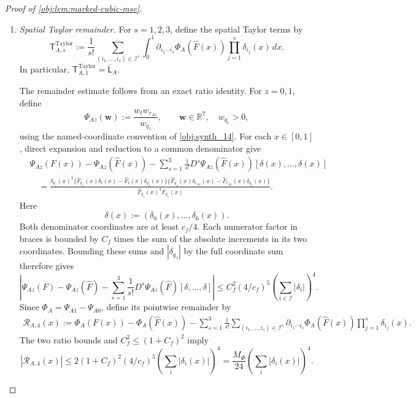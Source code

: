 \documentclass[11pt]{article}
\begin{document}
\begin{proof}[Proof of \cref{obj:lem:marked-cubic-mse}]
\begin{enumerate}
\item \textit{Spatial Taylor remainder.}
For \(s=1,2,3\), define the spatial Taylor terms by
\[
\mathsf T^{\mathrm{Taylor}}_{A,s}
:=
\frac1{s!}
\sum_{(i_1,\ldots,i_s)\in\mathcal I^s}
\int_0^1
\partial_{i_1\cdots i_s}\Phi_A(\widehat F(x))
\prod_{j=1}^s\delta_{i_j}(x)\,dx.
\]
In particular,
\(\mathsf T^{\mathrm{Taylor}}_{A,1}
=\overline{\mathsf L}_A\).

The remainder estimate follows from an exact ratio identity. For \(z=0,1\), define
\[
\Psi_{Az}(\mathbf w)
:=\frac{w_t w_{r_{Az}}}{w_{q_z}},
\qquad
\mathbf w\in\mathbb R^7,\quad w_{q_z}>0,
\]
using the named-coordinate convention of \cref{obj:synth_14}. For each \(x\in[0,1]\), direct expansion and reduction to a common denominator give
\[
\begin{aligned}
&\Psi_{Az}(F(x))-\Psi_{Az}(\widehat F(x))
-\sum_{s=1}^3\frac1{s!}
D^s\Psi_{Az}(\widehat F(x))
[\delta(x),\ldots,\delta(x)]\\
&\quad=
\frac{
\delta_{q_z}(x)^2
\{\widehat F_{q_z}(x)\delta_t(x)
-\widehat F_t(x)\delta_{q_z}(x)\}
\{\widehat F_{q_z}(x)\delta_{r_{Az}}(x)
-\widehat F_{r_{Az}}(x)\delta_{q_z}(x)\}
}{
\widehat F_{q_z}(x)^4 F_{q_z}(x)
}.
\end{aligned}
\]
Here
\[
\delta(x):=(\delta_0(x),\ldots,\delta_6(x)).
\]
Both denominator coordinates are at least \(c_f/4\). Each numerator factor in braces is bounded by \(C_f\) times the sum of the absolute increments in its two coordinates. Bounding these sums and \(|\delta_{q_z}|\) by the full coordinate sum therefore gives
\[
\left|
\Psi_{Az}(F)-\Psi_{Az}(\widehat F)
-\sum_{s=1}^3\frac1{s!}
D^s\Psi_{Az}(\widehat F)[\delta,\ldots,\delta]
\right|
\le C_f^2(4/c_f)^5
\left(\sum_{i\in\mathcal I}|\delta_i|\right)^4.
\]
Since \(\Phi_A=\Psi_{A1}-\Psi_{A0}\), define its pointwise remainder by
\[
\begin{aligned}
\mathcal R_{A,4}(x)
:=\Phi_A(F(x))-\Phi_A(\widehat F(x))
-\sum_{s=1}^3\frac1{s!}
\sum_{(i_1,\ldots,i_s)\in\mathcal I^s}
\partial_{i_1\cdots i_s}\Phi_A(\widehat F(x))
\prod_{j=1}^s\delta_{i_j}(x).
\end{aligned}
\]
The two ratio bounds and \(C_f^2\le(1+C_f)^2\) imply
\[
|\mathcal R_{A,4}(x)|
\le2(1+C_f)^2(4/c_f)^5
\left(\sum_i|\delta_i(x)|\right)^4
=
\frac{M_\Phi}{24}
\left(\sum_i|\delta_i(x)|\right)^4.
\]


\end{enumerate}
\end{proof}
\end{document}
